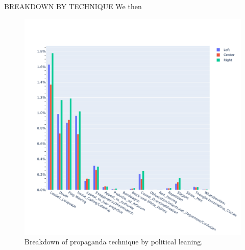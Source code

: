 



BREAKDOWN BY TECHNIQUE
We then

\begin{figure}[!htbp]
    \centering
    \includegraphics[width=\linewidth]{figures/prop_tech_detail_across_leaning_baly.pdf}
    \caption{Breakdown of propaganda technique by political leaning.}
    \label{fig:my_label}
\end{figure}


